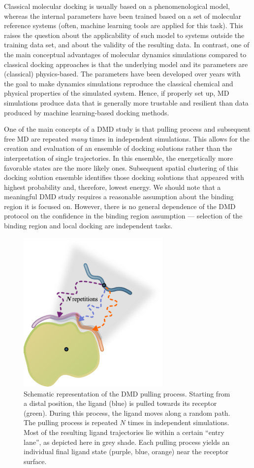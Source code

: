Classical molecular docking is usually based on a phenomenological model,
whereas the internal parameters have been trained based on a set of molecular
reference systems (often, machine learning tools are applied for this task).
This raises the question about the applicability of such model to systems
outside the training data set, and about the validity of the resulting data. In
contrast, one of the main conceptual advantages of molecular dynamics
simulations compared to classical docking approaches is that the underlying
model and its parameters are (classical) physics-based. The parameters have been
developed over years with the goal to make dynamics simulations reproduce the
classical chemical and physical properties of the simulated system. Hence, if
properly set up, MD simulations produce data that is generally more trustable
and resilient than data produced by machine learning-based docking methods.

One of the main concepts of a DMD study is that pulling process and subsequent
free MD are repeated \textit{many} times in independent simulations. This allows
for the creation and evaluation of an ensemble of docking solutions rather than
the interpretation of single trajectories. In this ensemble, the energetically
more favorable states are the more likely ones. Subsequent spatial clustering of
this docking solution ensemble identifies those docking solutions that appeared
with highest probability and, therefore, lowest energy. We should note that a
meaningful DMD study requires a reasonable assumption about the binding region
it is focused on. However, there is no general dependence of the DMD protocol on
the confidence in the binding region assumption --- selection of the binding
region and local docking are independent tasks.

\begin{figure}
\centering
\includegraphics[height=8cm]{gfx/dmd/scheme_n_repetitions_for_thesis_002.pdf}
\caption[]{Schematic representation of the DMD pulling process. Starting from a
distal position, the ligand (blue) is pulled towards its receptor (green).
During this process, the ligand moves along a random path. The pulling process
is repeated $N$ times in independent simulations. Most of the resulting ligand
trajectories lie within a certain \enquote{entry lane}, as depicted here in grey
shade. Each pulling process yields an individual final ligand state (purple,
blue, orange) near the receptor surface.}
\label{fig:dmd:n_repetitions}
\end{figure}


